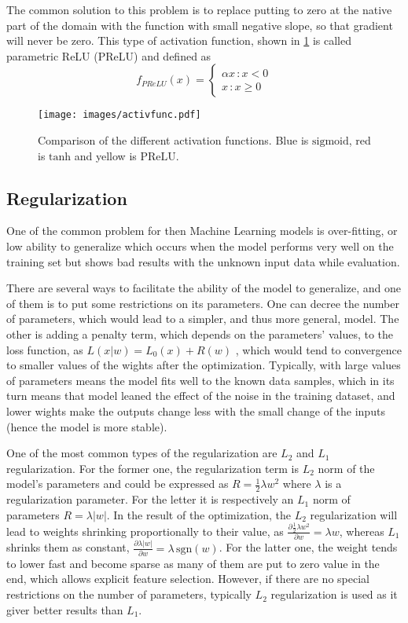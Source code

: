 The common solution to this problem is to replace putting to zero at the native part of the domain with the function with small negative slope, so that gradient will never be zero. 
This type of activation function, shown in \ref{fig:act_func} is called parametric ReLU (PReLU) and defined as  
\[ f_{PReLU}(x) = 
\begin{cases}
	\alpha x \, :x<0 \\
	x \, : x \geq 0
\end{cases}
\]

\begin{figure}[]
	\centering
	\texttt{[image: images/activfunc.pdf]}
	\caption{Comparison of the different activation functions. Blue is $\mathrm{sigmoid}$, red is $\mathrm{tanh}$ and yellow is $\mathrm{PReLU}$.}
	\label{fig:act_func}
\end{figure}


\subsection{Regularization}

One of the common problem for then Machine Learning models is over-fitting, or low ability to generalize which occurs when the model performs very well on the training set but shows bad results with the unknown input data while evaluation.


There are several ways to facilitate the ability of the model to generalize, and one of them is to put some restrictions on its parameters.
One can decree the number of parameters, which would lead to a simpler, and thus more general, model.
The other is adding a penalty term, which depends on the parameters' values, to the loss function, as $L(x|w) = L_{0}(x) + R(w)$ , which would tend to convergence to smaller values of the wights after the optimization. 
Typically, with large values of parameters means the model fits well to the known data samples, which in its turn means that model leaned the effect of the noise in the training dataset, and lower wights make the outputs change less with the small change of the inputs (hence the model is more stable).

One of the most common types of the regularization are $L_{2}$ and $L_{1}$ regularization.
For the former one, the regularization term is $L_{2}$ norm of the model's parameters and could be expressed as $R=\frac{1}{2}\lambda w^{2}$ where $\lambda$ is a regularization parameter.
For the letter it is respectively an $L_{1}$ norm of parameters $R=\lambda |w|$.
In the result of the optimization, the $L_{2}$ regularization will lead to weights shrinking proportionally to their value, as $\frac{\partial \frac{1}{2} \lambda w^{2} }{\partial w} = \lambda w$, whereas $L_{1}$ shrinks them as constant, $\frac{\partial \lambda |w| }{\partial w} = \lambda \, \mathrm{sgn}(w) $.
For the latter one, the weight tends to lower fast and become sparse as many of them are put to zero value in the end, which allows explicit feature selection.
However, if there are no special restrictions on the number of parameters, typically $L_{2}$ regularization is used as it giver better results than $L_{1}$.

